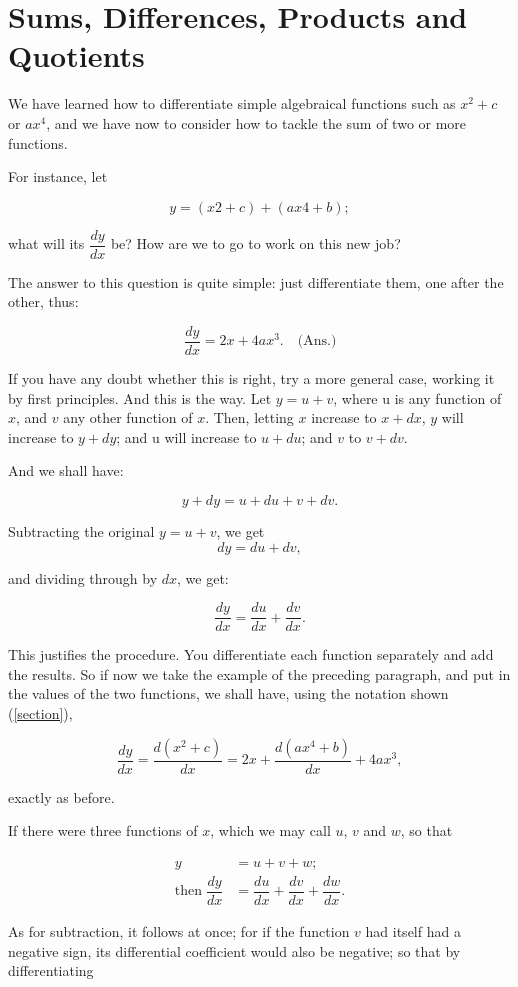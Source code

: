 \documentclass{ximera}
\begin{document}
\chapter{Sums, Differences, Products and Quotients}

We have learned how to differentiate simple algebraical functions such as $x^2+c$
or $ax^4$, and we have now to consider how to tackle the sum of two or more functions.

For instance, let

$$
y=(x2+c)+(ax4+b);
$$

what will its $\dfrac{dy}{dx}$ be? How are we to go to work on this new job?

The answer to this question is quite simple: just differentiate them, one after the other, thus:

$$
\dfrac{dy}{dx}=2x+4ax^3.\quad \text{(Ans.)}
$$

If you have any doubt whether this is right, try a more general case, working it by first principles. And this is 
the way. Let $y=u+v$, where u is any function of $x$, and $v$ any other function of $x$. Then, letting $x$ increase 
to $x+dx$, $y$ will increase to $y+dy$; and u will increase to $u+du$; and $v$ to $v+dv$.

And we shall have:

$$
y+dy=u+du+v+dv.
$$

Subtracting the original $y=u+v$, we get
$$
dy=du+dv,
$$

and dividing through by $dx$, we get:

$$
\dfrac{dy}{dx}=\dfrac{du}{dx}+\dfrac{dv}{dx}.
$$

This justifies the procedure. You differentiate each function separately and add the results. So if now we take 
the example of the preceding paragraph, and put in the values of the two functions, we shall have, using the notation 
shown (\ref{section}),

$$
\dfrac{dy}{dx}=\dfrac{d(x^2+c)}{dx}=2x+\dfrac{d(ax^4+b)}{dx}+4ax^3,
$$

exactly as before.

If there were three functions of $x$, which we may call $u$, $v$ and $w$, so that

\begin{align*}
y &=u+v+w;\\
\text{then}\;\dfrac{dy}{dx} &=\dfrac{du}{dx}+\dfrac{dv}{dx}+\dfrac{dw}{dx}.
\end{align*}

As for subtraction, it follows at once; for if the function $v$
had itself had a negative sign, its differential coefficient would also be negative; so that by differentiating
\end{document}
